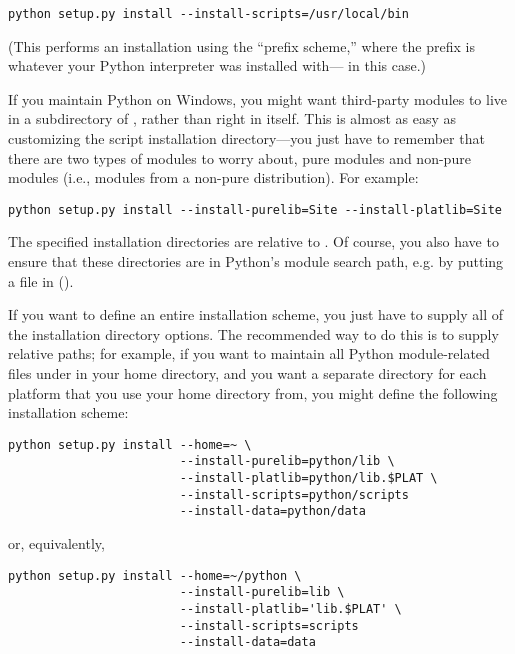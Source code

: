 \documentclass{howto}
\begin{document}
\begin{verbatim}
python setup.py install --install-scripts=/usr/local/bin
\end{verbatim}

(This performs an installation using the ``prefix scheme,'' where the
prefix is whatever your Python interpreter was installed with---
 in this case.)

If you maintain Python on Windows, you might want third-party modules to
live in a subdirectory of , rather than right in
 itself.  This is almost as easy as customizing the
script installation directory---you just have to remember that there are
two types of modules to worry about, pure modules and non-pure modules
(i.e., modules from a non-pure distribution).  For example:

\begin{verbatim}
python setup.py install --install-purelib=Site --install-platlib=Site
\end{verbatim}

The specified installation directories are relative to .
Of course, you also have to ensure that these directories are in
Python's module search path, e.g. by putting a  file in
 ().

If you want to define an entire installation scheme, you just have to
supply all of the installation directory options.  The recommended way
to do this is to supply relative paths; for example, if you want to
maintain all Python module-related files under  in your
home directory, and you want a separate directory for each platform that
you use your home directory from, you might define the following
installation scheme:

\begin{verbatim}
python setup.py install --home=~ \
                        --install-purelib=python/lib \
                        --install-platlib=python/lib.$PLAT \
                        --install-scripts=python/scripts
                        --install-data=python/data
\end{verbatim}

or, equivalently,

\begin{verbatim}
python setup.py install --home=~/python \
                        --install-purelib=lib \
                        --install-platlib='lib.$PLAT' \
                        --install-scripts=scripts
                        --install-data=data
\end{verbatim}
\end{document}
